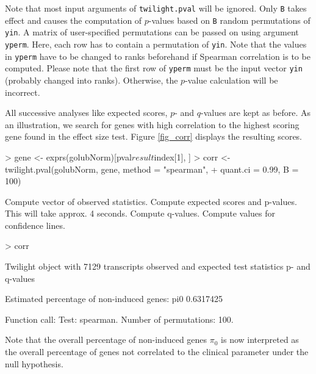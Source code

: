 \documentclass[11pt,a4paper,fleqn]{report}
\newcommand{\Rfunction}[1]{{\texttt{#1}}}
\newcommand{\Rfunarg}[1]{{\texttt{#1}}}
\begin{document}
Note that most input arguments of \Rfunction{twilight.pval} will be ignored. Only \Rfunarg{B} takes effect and causes the computation of $p$-values based on \Rfunarg{B} random permutations of \Rfunarg{yin}. A matrix of user-specified permutations can be passed on using argument \Rfunarg{yperm}. Here, each row has to contain a permutation of \Rfunarg{yin}. Note that the values in \Rfunarg{yperm} have to be changed to ranks beforehand if Spearman correlation is to be computed. Please note that the first row of \Rfunarg{yperm} must be the input vector \Rfunarg{yin} (probably changed into ranks). Otherwise, the $p$-value calculation will be incorrect.

All successive analyses like expected scores, $p$- and $q$-values are kept as before. As an illustration, we search for genes with high correlation to the highest scoring gene found in the effect size test. Figure \ref{fig_corr} displays the resulting scores.

\begin{Schunk}
\begin{Sinput}
> gene <- exprs(golubNorm)[pval$result$index[1], ]
> corr <- twilight.pval(golubNorm, gene, method = "spearman", 
+     quant.ci = 0.99, B = 100)
\end{Sinput}
\begin{Soutput}
Compute vector of observed statistics. 
Compute expected scores and p-values. This will take approx. 4 seconds. 
Compute q-values. 
Compute values for confidence lines. 
\end{Soutput}
\begin{Sinput}
> corr
\end{Sinput}
\begin{Soutput}
 Twilight object with
     7129 transcripts
     observed and expected test statistics
     p- and q-values

 Estimated percentage of non-induced genes:
      pi0 
0.6317425 

 Function call:
 Test: spearman. Number of permutations: 100. 
\end{Soutput}
\end{Schunk}

Note that the overall percentage of non-induced genes $\pi_0$ is now interpreted as the overall percentage of genes not correlated to the clinical parameter under the null hypothesis.
\end{document}
